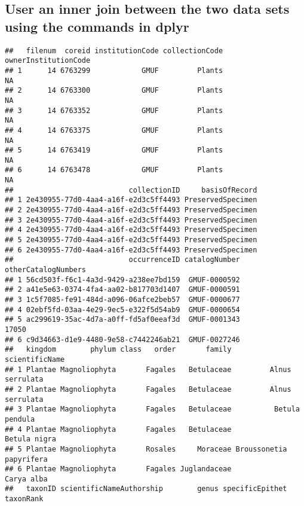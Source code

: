 \documentclass[
]{article}
\begin{document}
\hypertarget{user-an-inner-join-between-the-two-data-sets-using-the-commands-in-dplyr}{%
\subsection{User an inner join between the two data sets using the
commands in
dplyr}\label{user-an-inner-join-between-the-two-data-sets-using-the-commands-in-dplyr}}

\begin{verbatim}
##   filenum  coreid institutionCode collectionCode ownerInstitutionCode
## 1      14 6763299            GMUF         Plants                   NA
## 2      14 6763300            GMUF         Plants                   NA
## 3      14 6763352            GMUF         Plants                   NA
## 4      14 6763375            GMUF         Plants                   NA
## 5      14 6763419            GMUF         Plants                   NA
## 6      14 6763478            GMUF         Plants                   NA
##                           collectionID     basisOfRecord
## 1 2e430955-77d0-4aa4-a16f-e2d3c5ff4493 PreservedSpecimen
## 2 2e430955-77d0-4aa4-a16f-e2d3c5ff4493 PreservedSpecimen
## 3 2e430955-77d0-4aa4-a16f-e2d3c5ff4493 PreservedSpecimen
## 4 2e430955-77d0-4aa4-a16f-e2d3c5ff4493 PreservedSpecimen
## 5 2e430955-77d0-4aa4-a16f-e2d3c5ff4493 PreservedSpecimen
## 6 2e430955-77d0-4aa4-a16f-e2d3c5ff4493 PreservedSpecimen
##                           occurrenceID catalogNumber otherCatalogNumbers
## 1 56cd503f-f6c1-4a3d-9429-a238ee7bd159  GMUF-0000592                    
## 2 a41e5e63-0374-4fa4-aa02-b817703d1407  GMUF-0000591                    
## 3 1c5f7085-fe91-484d-a096-06afce2beb57  GMUF-0000677                    
## 4 02ebf5fd-03aa-4e29-9ec5-e322f5d54ab9  GMUF-0000654                    
## 5 ac299619-35ac-4d7a-a0ff-fd5af0eeaf3d  GMUF-0001343               17050
## 6 c9d34663-d1e9-4480-9e58-c7442246ab21  GMUF-0027246                    
##   kingdom        phylum class   order       family          scientificName
## 1 Plantae Magnoliophyta       Fagales   Betulaceae         Alnus serrulata
## 2 Plantae Magnoliophyta       Fagales   Betulaceae         Alnus serrulata
## 3 Plantae Magnoliophyta       Fagales   Betulaceae          Betula pendula
## 4 Plantae Magnoliophyta       Fagales   Betulaceae            Betula nigra
## 5 Plantae Magnoliophyta       Rosales     Moraceae Broussonetia papyrifera
## 6 Plantae Magnoliophyta       Fagales Juglandaceae              Carya alba
##   taxonID scientificNameAuthorship        genus specificEpithet taxonRank

\end{verbatim}
\end{document}
